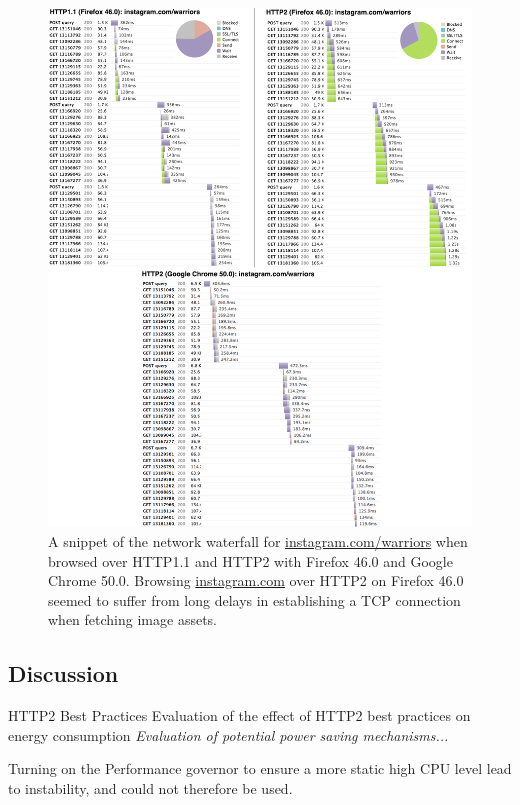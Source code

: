 \documentclass{article}
\begin{document}
\begin{figure}[h!]
    \centering
    \includegraphics[width=1.1\linewidth]{images/waterfall_instagram}
    \caption{A snippet of the network waterfall for \url{instagram.com/warriors} when browsed over HTTP1.1 and HTTP2 with Firefox 46.0 and Google Chrome 50.0. Browsing \url{instagram.com} over HTTP2 on Firefox 46.0 seemed to suffer from long delays in establishing a TCP connection when fetching image assets.}
    \label{fig:instagram-waterfall}
\end{figure}

\clearpage

\subsection{Discussion}
\label{chapter:discussion-part2}

HTTP2 Best Practices
Evaluation of the effect of HTTP2 best practices on energy consumption
\emph{Evaluation of potential power saving mechanisms...}

Turning on the Performance governor to ensure a more static high CPU level lead to instability, and could not therefore be used.
\end{document}
